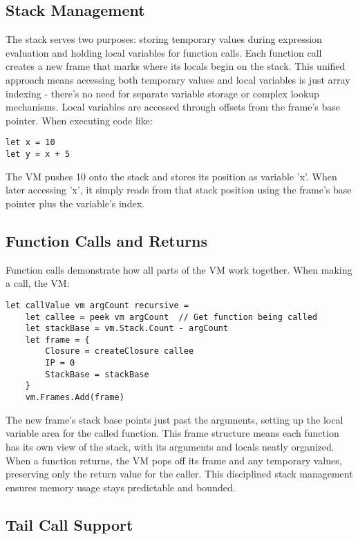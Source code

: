 \subsection{Stack Management}

The stack serves two purposes: storing temporary values during expression evaluation and holding local variables for function calls. Each function call creates a new frame that marks where its locals begin on the stack. This unified approach means accessing both temporary values and local variables is just array indexing - there's no need for separate variable storage or complex lookup mechanisms.
Local variables are accessed through offsets from the frame's base pointer. When executing code like:

\begin{verbatim}
let x = 10
let y = x + 5
\end{verbatim}
The VM pushes 10 onto the stack and stores its position as variable 'x'. When later accessing 'x', it simply reads from that stack position using the frame's base pointer plus the variable's index.

\subsection{Function Calls and Returns}

Function calls demonstrate how all parts of the VM work together. When making a call, the VM:

\begin{verbatim}
let callValue vm argCount recursive =
    let callee = peek vm argCount  // Get function being called
    let stackBase = vm.Stack.Count - argCount
    let frame = {
        Closure = createClosure callee
        IP = 0
        StackBase = stackBase
    }
    vm.Frames.Add(frame)
\end{verbatim}

The new frame's stack base points just past the arguments, setting up the local variable area for the called function. This frame structure means each function has its own view of the stack, with its arguments and locals neatly organized.
When a function returns, the VM pops off its frame and any temporary values, preserving only the return value for the caller. This disciplined stack management ensures memory usage stays predictable and bounded.

\subsection{Tail Call Support}

